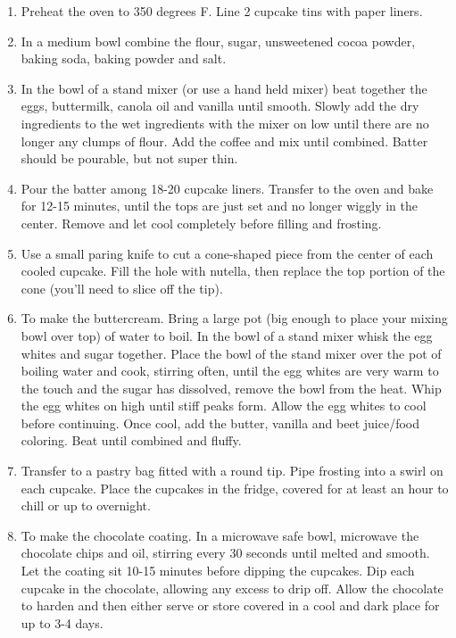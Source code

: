 \documentclass[
  letterpaper,
  DIV=11,
  numbers=noendperiod,
  titlepage=false]{scrreprt}
\providecommand{\tightlist}{%
  \setlength{\itemsep}{0pt}\setlength{\parskip}{0pt}}\usepackage{longtable,booktabs,array}
\begin{document}
\begin{enumerate}
\def\labelenumi{\arabic{enumi}.}
\tightlist
\item
  Preheat the oven to 350 degrees F. Line 2 cupcake tins with paper
  liners.
\item
  In a medium bowl combine the flour, sugar, unsweetened cocoa powder,
  baking soda, baking powder and salt.
\item
  In the bowl of a stand mixer (or use a hand held mixer) beat together
  the eggs, buttermilk, canola oil and vanilla until smooth. Slowly add
  the dry ingredients to the wet ingredients with the mixer on low until
  there are no longer any clumps of flour. Add the coffee and mix until
  combined. Batter should be pourable, but not super thin.
\item
  Pour the batter among 18-20 cupcake liners. Transfer to the oven and
  bake for 12-15 minutes, until the tops are just set and no longer
  wiggly in the center. Remove and let cool completely before filling
  and frosting.
\item
  Use a small paring knife to cut a cone-shaped piece from the center of
  each cooled cupcake. Fill the hole with nutella, then replace the top
  portion of the cone (you'll need to slice off the tip).
\item
  To make the buttercream. Bring a large pot (big enough to place your
  mixing bowl over top) of water to boil. In the bowl of a stand mixer
  whisk the egg whites and sugar together. Place the bowl of the stand
  mixer over the pot of boiling water and cook, stirring often, until
  the egg whites are very warm to the touch and the sugar has dissolved,
  remove the bowl from the heat. Whip the egg whites on high until stiff
  peaks form. Allow the egg whites to cool before continuing. Once cool,
  add the butter, vanilla and beet juice/food coloring. Beat until
  combined and fluffy.
\item
  Transfer to a pastry bag fitted with a round tip. Pipe frosting into a
  swirl on each cupcake. Place the cupcakes in the fridge, covered for
  at least an hour to chill or up to overnight.
\item
  To make the chocolate coating. In a microwave safe bowl, microwave the
  chocolate chips and oil, stirring every 30 seconds until melted and
  smooth. Let the coating sit 10-15 minutes before dipping the cupcakes.
  Dip each cupcake in the chocolate, allowing any excess to drip off.
  Allow the chocolate to harden and then either serve or store covered
  in a cool and dark place for up to 3-4 days.
\end{enumerate}
\end{document}

